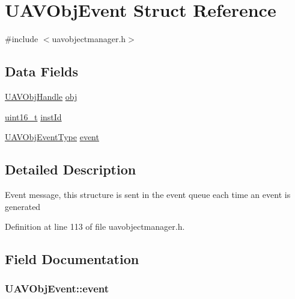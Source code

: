\hypertarget{struct_u_a_v_obj_event}{\section{U\-A\-V\-Obj\-Event Struct Reference}
\label{struct_u_a_v_obj_event}
}


{\ttfamily \#include $<$uavobjectmanager.\-h$>$}

\subsection*{Data Fields}
\begin{DoxyCompactItemize}
\item 
\hyperlink{group___n_a_m_e_gac31715ab50a1903838e7d87c8022ec75}{U\-A\-V\-Obj\-Handle} \hyperlink{struct_u_a_v_obj_event_a716555d74d08184a3807881d9ade9232}{obj}
\item 
\hyperlink{stdint_8h_a273cf69d639a59973b6019625df33e30}{uint16\-\_\-t} \hyperlink{struct_u_a_v_obj_event_ad55867963dc4e2172799430c0b2323d8}{inst\-Id}
\item 
\hyperlink{group___u_a_v_ga34a55b89fda6526f21cfdcab529d0f99}{U\-A\-V\-Obj\-Event\-Type} \hyperlink{struct_u_a_v_obj_event_aa32f88659bb182b0178e388630c9a161}{event}
\end{DoxyCompactItemize}


\subsection{Detailed Description}
Event message, this structure is sent in the event queue each time an event is generated 

Definition at line 113 of file uavobjectmanager.\-h.



\subsection{Field Documentation}
\hypertarget{struct_u_a_v_obj_event_aa32f88659bb182b0178e388630c9a161}{
\subsubsection[{event}]{ U\-A\-V\-Obj\-Event\-::event}}\label{struct_u_a_v_obj_event_aa32f88659bb182b0178e388630c9a161}


